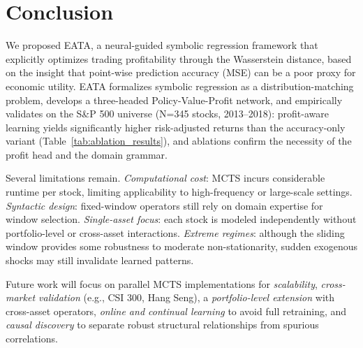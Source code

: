 \section{Conclusion}
\label{sec:conclusion}

We proposed EATA, a neural-guided symbolic regression framework that explicitly optimizes trading profitability through the Wasserstein distance, based on the insight that point-wise prediction accuracy (MSE) can be a poor proxy for economic utility. EATA formalizes symbolic regression as a distribution-matching problem, develops a three-headed Policy-Value-Profit network, and empirically validates on the S\&P 500 universe (N=345 stocks, 2013--2018): profit-aware learning yields significantly higher risk-adjusted returns than the accuracy-only variant (Table~\ref{tab:ablation_results}), and ablations confirm the necessity of the profit head and the domain grammar.

Several limitations remain. \textit{Computational cost}: MCTS incurs considerable runtime per stock, limiting applicability to high-frequency or large-scale settings. \textit{Syntactic design}: fixed-window operators still rely on domain expertise for window selection. \textit{Single-asset focus}: each stock is modeled independently without portfolio-level or cross-asset interactions. \textit{Extreme regimes}: although the sliding window provides some robustness to moderate non-stationarity, sudden exogenous shocks may still invalidate learned patterns.

Future work will focus on parallel MCTS implementations for \textit{scalability}, \textit{cross-market validation} (e.g., CSI 300, Hang Seng), a \textit{portfolio-level extension} with cross-asset operators, \textit{online and continual learning} to avoid full retraining, and \textit{causal discovery} to separate robust structural relationships from spurious correlations.
